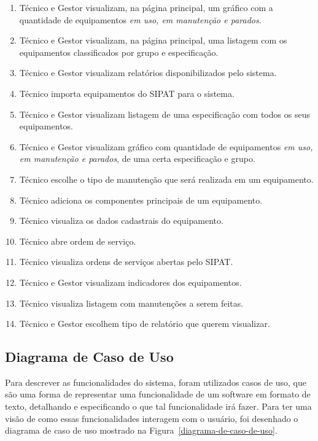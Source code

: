 \begin{enumerate}
	\item Técnico e Gestor visualizam, na página principal, um gráfico com a quantidade de equipamentos \textit{em uso, em manutenção e parados}.
	\item Técnico e Gestor visualizam, na página principal, uma listagem com os equipamentos classificados por grupo e especificação.
	\item Técnico e Gestor visualizam relatórios disponibilizados pelo sistema.
	\item Técnico importa equipamentos do SIPAT para o sistema.
	\item Técnico e Gestor visualizam listagem de uma especificação com todos os seus equipamentos.
	\item Técnico e Gestor visualizam gráfico com quantidade de equipamentos \textit{em uso, em manutenção e parados}, de uma certa especificação e grupo.
	\item Técnico escolhe o tipo de manutenção que será realizada em um equipamento.
	\item Técnico adiciona os componentes principais de um equipamento.
	\item Técnico visualiza os dados cadastrais do equipamento.
	\item Técnico abre ordem de serviço.
	\item Técnico visualiza ordens de serviços abertas pelo SIPAT.
	\item Técnico e Gestor visualizam indicadores dos equipamentos.
	\item Técnico visualiza listagem com manutenções a serem feitas.
	\item Técnico e Gestor escolhem tipo de relatório que querem visualizar.
\end{enumerate}


\subsection{Diagrama de Caso de Uso}
\label{uc}

Para descrever as funcionalidades do sistema, foram utilizados casos de uso, que são uma forma de representar uma funcionalidade de um software em formato de texto, detalhando e especificando o que tal funcionalidade irá fazer. Para ter uma visão de como essas funcionalidades interagem com o usuário, foi desenhado o diagrama de caso de uso mostrado na Figura~\ref{diagrama-de-caso-de-uso}. 

